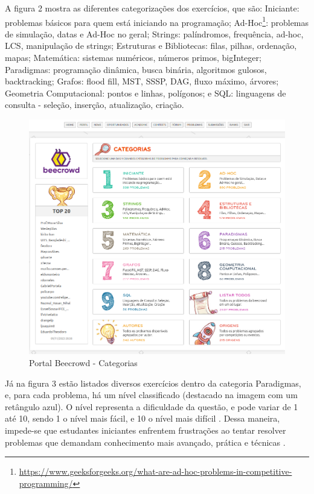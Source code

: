 A figura 2 mostra as diferentes categorizações dos exercícios, que são: Iniciante: problemas básicos para quem está iniciando na programação; Ad-Hoc\footnote{\url{https://www.geeksforgeeks.org/what-are-ad-hoc-problems-in-competitive-programming/}}: problemas de simulação, datas e Ad-Hoc no geral; Strings: palíndromos, frequência, ad-hoc, LCS, manipulação de strings; Estruturas e Bibliotecas: filas, pilhas, ordenação, mapas; Matemática: sistemas numéricos, números primos, bigInteger; Paradigmas: programação dinâmica, busca binária, algoritmos gulosos, backtracking; Grafos: flood fill, MST, SSSP, DAG, fluxo máximo, árvores; Geometria Computacional: pontos e linhas, polígonos; e SQL: linguagens de consulta - seleção, inserção, atualização, criação.

\begin{figure}[h!]
	   \centering
            \caption{Portal Beecrowd - Categorias}
            \label{fig:ModeloConceitual}
	   	\includegraphics[scale=0.3]{pictures/beecrowd_problemas.png}
\end{figure}

Já na figura 3 estão listados diversos exercícios dentro da categoria Paradigmas, e, para cada problema, há um nível classificado (destacado na imagem com um retângulo azul). O nível representa a dificuldade da questão, e pode variar de 1 até 10, sendo 1 o nível mais fácil, e 10 o nível mais difícil \cite{beecrowd}. Dessa maneira, impede-se que estudantes iniciantes enfrentem frustrações ao tentar resolver problemas que demandam conhecimento mais avançado, prática e técnicas \cite[p.~239]{beztonin2014}.

